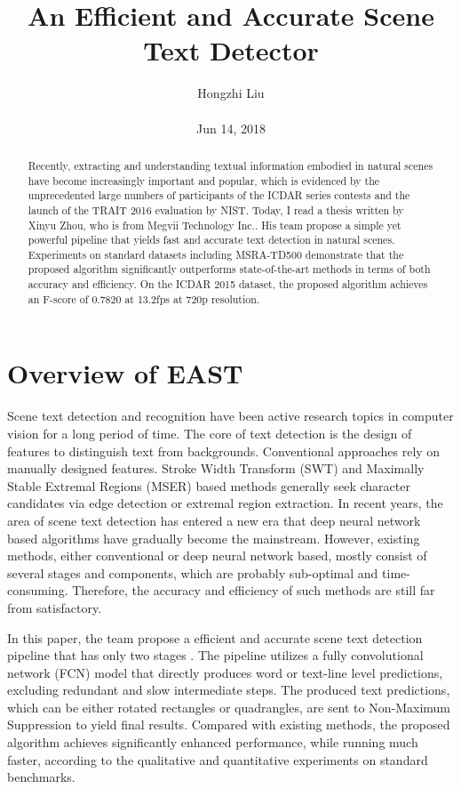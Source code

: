 \documentclass[10pt,twocolumn,letterpaper]{article}
\title{An Efficient and Accurate Scene Text Detector}
\author{Hongzhi Liu\\\\
Jun 14, 2018}
\begin{document}
\maketitle
\begin{abstract}
	Recently, extracting and understanding textual information embodied in natural scenes have become increasingly important and popular, which is evidenced by the unprecedented large numbers of participants of the ICDAR series contests and the launch of the TRAIT 2016 evaluation by NIST. Today, I read a thesis written by Xinyu Zhou, who is from Megvii Technology Inc.. His team propose a simple yet powerful pipeline that yields fast and accurate text detection in natural scenes. Experiments on standard datasets including MSRA-TD500 demonstrate that the proposed algorithm significantly outperforms state-of-the-art methods in terms of both accuracy and efficiency. On the ICDAR 2015 dataset, the proposed algorithm achieves an F-score of 0.7820 at 13.2fps at 720p resolution.
\end{abstract}
\section{Overview of EAST}

Scene text detection and recognition have been active research topics in computer vision for a long period of time. The core of text detection is the design of features to distinguish text from backgrounds. Conventional approaches rely on manually designed features. Stroke Width Transform (SWT) \cite{Epshtein2010Detecting} and Maximally Stable Extremal Regions (MSER) \cite{Neumann2011A} based methods generally seek character candidates via edge detection or extremal region extraction. In recent years, the area of scene text detection has entered a new era that deep neural network based algorithms \cite{Huang2014Robust} have gradually become the mainstream. However, existing methods, either conventional or deep neural network based, mostly consist of several stages and components, which are probably sub-optimal and time-consuming. Therefore, the accuracy and efficiency of such methods are still far from satisfactory.

In this paper, the team propose a efficient and accurate scene text detection pipeline that has only two stages \cite{Zhou2017EAST}. The pipeline utilizes a fully convolutional network (FCN) model that directly produces word or text-line level predictions, excluding redundant and slow intermediate steps. The produced text predictions, which can be either rotated rectangles or quadrangles, are sent to Non-Maximum Suppression to yield final results. Compared with existing methods, the proposed algorithm achieves significantly enhanced performance, while running much faster, according to the qualitative and quantitative experiments on standard benchmarks.
\end{document}
